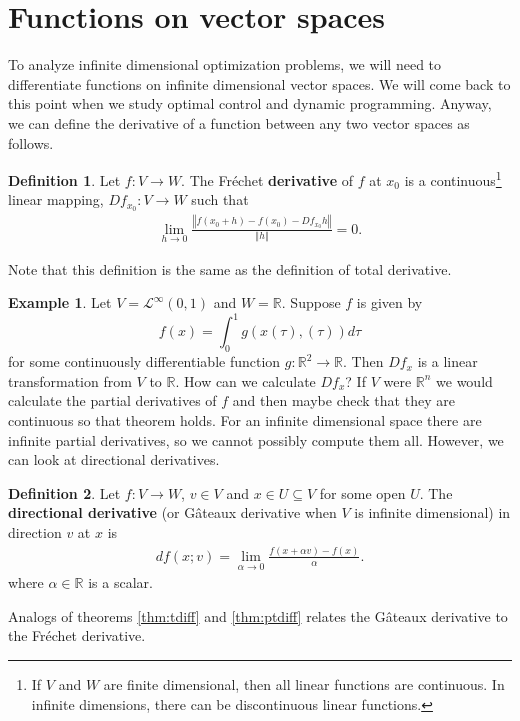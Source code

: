 \documentclass[12pt,reqno]{amsart}
\theoremstyle{definition}
\newtheorem{definition}{Definition}[section]
\newtheorem{example}{Example}[section]
\def\R{\mathbb{R}}
\newcommand{\norm}[1]{\left\Vert {#1} \right\Vert}
\renewcommand{\to}{{\rightarrow}}
\begin{document}
\section{Functions on vector spaces}
To analyze infinite dimensional optimization problems, we will need to
differentiate functions on infinite dimensional vector spaces. We will
come back to this point when we study optimal control and dynamic
programming. Anyway, we can define the derivative of a function
between any two vector spaces as follows. 
\begin{definition}
  Let $f: V \to W$. The Fr\'{e}chet \textbf{derivative} of $f$ at
  $x_0$ is a continuous\footnote{If $V$
    and $W$ are finite dimensional, then all linear functions are
    continuous. In infinite dimensions, there can be discontinuous
    linear functions.} linear mapping, $Df_{x_0}: V \to W$ such that
  \begin{align*}
    \lim_{h \to 0} \frac{\left\Vert f(x_0 + h) - f(x_0) - Df_{x_0}
        h\right\Vert} {\norm{h}} = 0. 
  \end{align*}
\end{definition}
Note that this definition is the same as the definition of total
derivative. 
\begin{example}\label{ex:fre}
  Let $V = \mathcal{L}^\infty(0,1)$ and $W = \R$. Suppose $f$ is given by
  \[ f(x) = \int_0^1 g(x(\tau),(\tau)) d\tau \] 
  for some continuously differentiable function $g:\R^2 \to
  \R$. 
  Then $Df_{x}$ is a linear transformation from $V$ to $\R$. How
  can we calculate $Df_x$? If $V$ were $\R^n$ we would calculate the
  partial derivatives of $f$ and then maybe check that they are
  continuous so that theorem \label{thm:ptdiff} holds. For an infinite
  dimensional space there are infinite partial derivatives, so we
  cannot possibly compute them all. However, we can look at
  directional derivatives. 
\end{example}
\begin{definition}
  Let $f: V \to W$, $v \in V$ and $x \in U \subseteq V$ for some open
  $U$. The \textbf{directional derivative} (or G\^{a}teaux derivative
  when $V$ is infinite dimensional)  in direction $v$ at $x$ is
  \begin{align*}
    df(x;v) = \lim_{\alpha \to 0} \frac{f(x + \alpha v) - f(x)}{\alpha}.
  \end{align*}  
  where $\alpha \in \R$ is a scalar.
\end{definition}
Analogs of theorems \ref{thm:tdiff} and \ref{thm:ptdiff} relates the
G\^{a}teaux derivative to the Fr\'{e}chet derivative.
\end{document}

